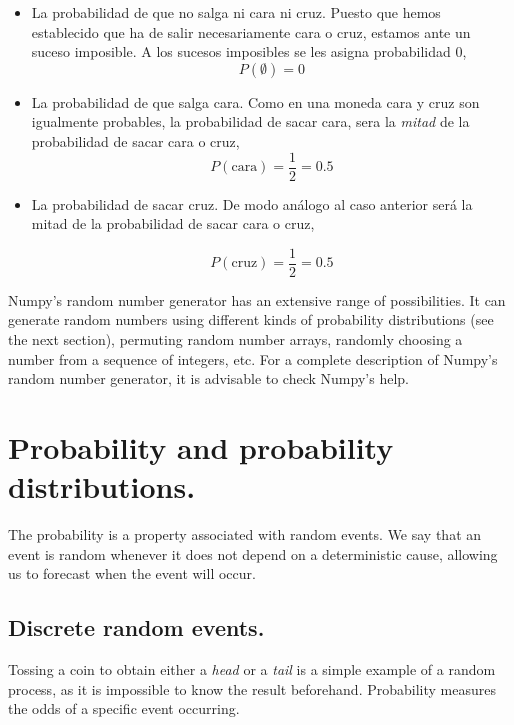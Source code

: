 \begin{paracol}{2}
\begin{itemize}
\item La probabilidad de que no salga ni cara ni cruz. Puesto que hemos establecido que ha de salir necesariamente cara o cruz, estamos ante un suceso imposible. A los sucesos imposibles se les asigna probabilidad $0$,
\begin{equation*}
P(\emptyset) = 0
\end{equation*}

\item La probabilidad de que salga cara. Como en una moneda cara y cruz son igualmente probables,  la probabilidad de sacar cara, sera la \emph{mitad} de la probabilidad de sacar cara o cruz,
\begin{equation*}
P(\text{cara})=\frac{1}{2}=0.5
\end{equation*}

\item La probabilidad de sacar cruz. De modo análogo al caso anterior será la mitad de la probabilidad de sacar cara o cruz, 

\begin{equation*}
P(\text{cruz})=\frac{1}{2}=0.5
\end{equation*} 
\end{itemize}
\switchcolumn
Numpy's random number generator has an extensive range of possibilities. It can generate random numbers using different kinds of probability distributions (see the next section), permuting random number arrays, randomly choosing a number from a sequence of integers, etc. For a complete description of Numpy's random number generator, it is advisable to check Numpy's help. 

\section{Probability and probability distributions.}
The probability is a property associated with random events. We say that an event is random whenever it does not depend on a deterministic cause, allowing us to forecast when the event will occur.

\subsection{Discrete random events.}
Tossing a coin to obtain either a \emph{head} or a \emph{tail} is a simple example of a random process, as it is impossible to know the result beforehand. Probability measures the odds of a specific event occurring.


\end{paracol}
